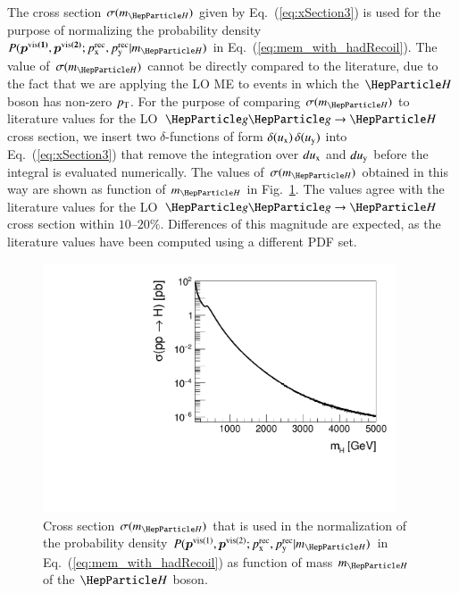 The cross section $\sigma(m_{\PHiggs})$ given by
Eq.~(\ref{eq:xSection3}) is used for the purpose of normalizing
the probability density $P(\bm{p^{\vis(1)}},\bm{p^{\vis(2)}};\pX^{\rec},\pY^{\rec}|m_{\PHiggs})$ in Eq.~(\ref{eq:mem_with_hadRecoil}).
The value of $\sigma(m_{\PHiggs})$ cannot be directly compared to the literature,
due to the fact that we are applying the LO ME to events in which the $\PHiggs$ boson has non-zero $p_{\textrm{T}}$.
For the purpose of comparing $\sigma(m_{\PHiggs})$ to literature
values for the LO $\Pg\Pg \to \PHiggs$ cross section,
we insert two $\delta$-functions of form $\delta(u_{\textrm{x}}) \, \delta(u_{\textrm{y}})$
into Eq.~(\ref{eq:xSection3}) that
remove the integration over $du_{\textrm{x}}$ and $du_{\textrm{y}}$ before the integral is
evaluated numerically.
The values of $\sigma(m_{\PHiggs})$ obtained in this way are shown as function of
$m_{\PHiggs}$ in Fig.~\ref{fig:xSection}.
The values agree with the literature values for the LO $\Pg\Pg \to
\PHiggs$ cross section within $10$--$20\%$. 
Differences of this magnitude are expected, as the literature values
have been computed using a different PDF set.

\begin{figure}
\begin{center}
\includegraphics*[height=74mm]{figures/makeSVfitMEM_xSectionPlot_log.pdf}
\end{center}
\caption{
  Cross section $\sigma(m_{\PHiggs})$ 
  that is used in the normalization of the probability density $P(\bm{p}^{\vis(1)},\bm{p}^{\vis(2)};\pX^{\rec},\pY^{\rec}|m_{\PHiggs})$ in Eq.~(\ref{eq:mem_with_hadRecoil})
  as function of mass $m_{\PHiggs}$ of the $\PHiggs$ boson.
}
\label{fig:xSection}
\end{figure}

